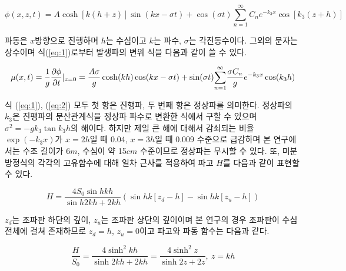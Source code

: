 \begin{equation} \label{eq:1}
{
\phi(x, z, t) = A\cosh{[k(h+z)]}\sin(kx-\sigma t) +
\cos(\sigma t){\sum_{n=1}^{\infty}} C_n e^{-k_3 x} \cos{[k_3 (z+h)]} 
}
\end{equation}


파동은 $x$방향으로 진행하며 $h$는 수심이고 $k$는 파수, $\sigma$는 각진동수이다. 그외의 문자는 상수이며 식(\ref{eq:1})로부터 발생파의 변위 식을 다음과 같이 쓸 수 있다.

\begin{equation} \label{eq:2}
{
\mu(x, t) = {{1 \over g}{{\partial \phi} \over {\partial t}}|_{z=0} } = \frac{A \sigma}{g} \cosh(kh) \cos(kx-\sigma t) +
\sin(\sigma t) {\sum_{n=1}^{\infty}} \frac{\sigma C_n}{g} e^{-k_3 x} \cos(k_3 h)
}
\end{equation}


식 (\ref{eq:1}), (\ref{eq:2}) 모두 첫 항은 진행파, 두 번째 항은 정상파를 의미한다. 정상파의 $k_3$은 진팽파의 분산관계식을 정상파 파수로 변환한 식에서 구할 수 있으며 $\sigma ^2 = -g k_3 \tan{k_3 h}$의 해이다. 하지만 제일 큰 해에 대해서 감쇠되는 비율 $\exp{(-k_{3}x)}$가 $x=2h$일 때 $0.04$, $x=3h$일 때 0.009 수준으로 급감하며 본 연구에서는 수조 길이가 6$m$, 수심이 약 15$cm$ 수준이므로 정상파는 무시할 수 있다. 또, 미분방정식의 각각의 고유함수에 대해 일차 근사를 적용하여 파고 $H$를 다음과 같이 표현할 수 있다.

\begin{equation} \label{eq:4}
H = \frac{4 S_0 \sin h{kh}}{\sin h{2kh}+2kh} \left(\sin h{k[z_d - h]} - \sin h{k[z_u - h]}\right)
\end{equation}


$z_d$는 조파판 하단의 깊이, $z_u$는 조파판 상단의 깊이이며 본 연구의 경우 조파판이 수심 전체에 걸쳐 존재하므로 $z_d = h$, $z_u = 0$이고 파고와 파동 함수는 다음과 같다.

\begin{equation} \label{eq:5}
{
    \frac{H}{S_0}=\frac{4 \sinh^2 k h}{\sinh 2kh + 2kh}
     = \frac{4 \sinh^2 z}{\sinh 2z+2 z}, ~z=kh
}
\end{equation}

